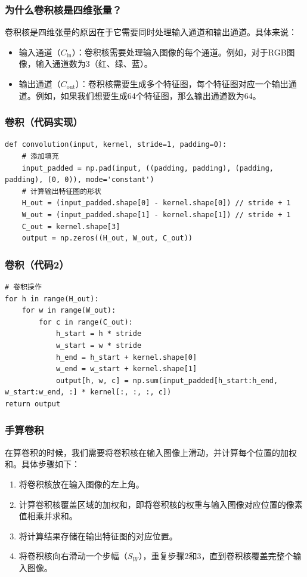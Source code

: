 \documentclass[fontset=none]{ctexbeamer}
\begin{document}
\begin{frame}
    \frametitle{为什么卷积核是四维张量？}

卷积核是四维张量的原因在于它需要同时处理输入通道和输出通道。具体来说：
\begin{itemize}
    \item 输入通道（$C_\text{in}$）：卷积核需要处理输入图像的每个通道。例如，对于RGB图像，输入通道数为3（红、绿、蓝）。
    \item 输出通道（$C_\text{out}$）：卷积核需要生成多个特征图，每个特征图对应一个输出通道。例如，如果我们想要生成64个特征图，那么输出通道数为64。
\end{itemize}

\end{frame}

\begin{frame}[fragile]
    \frametitle{卷积（代码实现）}

    \begin{verbatim}
def convolution(input, kernel, stride=1, padding=0):
    # 添加填充
    input_padded = np.pad(input, ((padding, padding), (padding, padding), (0, 0)), mode='constant')
    # 计算输出特征图的形状
    H_out = (input_padded.shape[0] - kernel.shape[0]) // stride + 1
    W_out = (input_padded.shape[1] - kernel.shape[1]) // stride + 1
    C_out = kernel.shape[3]
    output = np.zeros((H_out, W_out, C_out))

    \end{verbatim}

\end{frame}

\begin{frame}[fragile]
    \frametitle{卷积（代码2）}

    \begin{verbatim}
# 卷积操作
for h in range(H_out):
    for w in range(W_out):
        for c in range(C_out):
            h_start = h * stride
            w_start = w * stride
            h_end = h_start + kernel.shape[0]
            w_end = w_start + kernel.shape[1]
            output[h, w, c] = np.sum(input_padded[h_start:h_end, w_start:w_end, :] * kernel[:, :, :, c])
return output
    \end{verbatim}

    

\end{frame}

\begin{frame}
    \frametitle{手算卷积}

    在算卷积的时候，我们需要将卷积核在输入图像上滑动，并计算每个位置的加权和。具体步骤如下：
\begin{enumerate}
    \item 将卷积核放在输入图像的左上角。
    \item 计算卷积核覆盖区域的加权和，即将卷积核的权重与输入图像对应位置的像素值相乘并求和。
    \item 将计算结果存储在输出特征图的对应位置。
    \item 将卷积核向右滑动一个步幅（$S_W$），重复步骤2和3，直到卷积核覆盖完整个输入图像。
\end{enumerate}

\end{frame}
\end{document}
